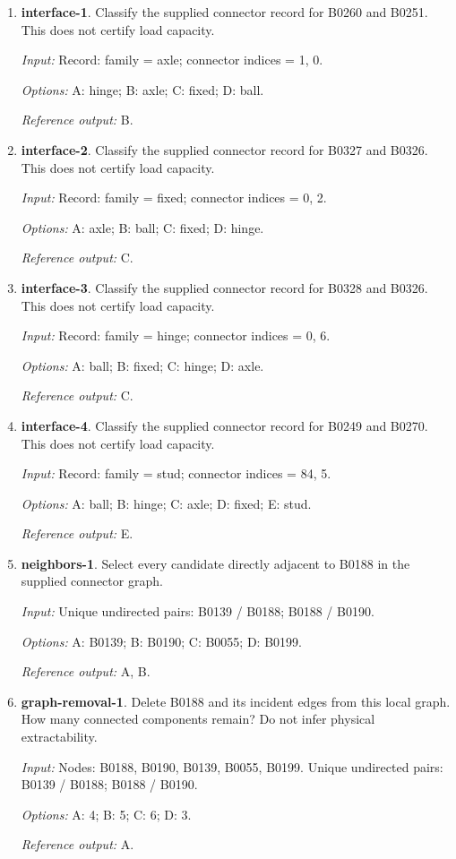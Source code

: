 \begin{enumerate}
\item \textbf{interface-1}. Classify the supplied connector record for B0260 and B0251. This does not certify load capacity.\par {\small \textit{Input:} Record: family = axle; connector indices = 1, 0. \par\textit{Options:} A: hinge; B: axle; C: fixed; D: ball. \par\textit{Reference output:} B.}
\item \textbf{interface-2}. Classify the supplied connector record for B0327 and B0326. This does not certify load capacity.\par {\small \textit{Input:} Record: family = fixed; connector indices = 0, 2. \par\textit{Options:} A: axle; B: ball; C: fixed; D: hinge. \par\textit{Reference output:} C.}
\item \textbf{interface-3}. Classify the supplied connector record for B0328 and B0326. This does not certify load capacity.\par {\small \textit{Input:} Record: family = hinge; connector indices = 0, 6. \par\textit{Options:} A: ball; B: fixed; C: hinge; D: axle. \par\textit{Reference output:} C.}
\item \textbf{interface-4}. Classify the supplied connector record for B0249 and B0270. This does not certify load capacity.\par {\small \textit{Input:} Record: family = stud; connector indices = 84, 5. \par\textit{Options:} A: ball; B: hinge; C: axle; D: fixed; E: stud. \par\textit{Reference output:} E.}
\item \textbf{neighbors-1}. Select every candidate directly adjacent to B0188 in the supplied connector graph.\par {\small \textit{Input:} Unique undirected pairs: B0139 / B0188; B0188 / B0190. \par\textit{Options:} A: B0139; B: B0190; C: B0055; D: B0199. \par\textit{Reference output:} A, B.}
\item \textbf{graph-removal-1}. Delete B0188 and its incident edges from this local graph. How many connected components remain? Do not infer physical extractability.\par {\small \textit{Input:} Nodes: B0188, B0190, B0139, B0055, B0199. Unique undirected pairs: B0139 / B0188; B0188 / B0190. \par\textit{Options:} A: 4; B: 5; C: 6; D: 3. \par\textit{Reference output:} A.}

\end{enumerate}
